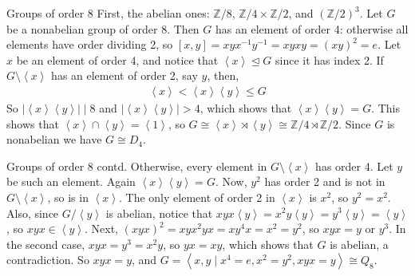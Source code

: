 \documentclass{beamer}
\def\mbb#1{\mathbb{#1}}
\newcommand{\Z}{\mbb Z}
\newcommand{\gen}[1]{\left\langle #1 \right\rangle}
\newcommand{\nsg}{\trianglelefteq}
\begin{document}
\begin{frame}{Groups of order 8}
	First, the abelian ones: $\Z/8$, $\Z/4 \times \Z/2$, and $(\Z/2)^3$. Let $G$ be a nonabelian group of order 8. Then $G$ has an element of order 4: otherwise all elements have order dividing 2, so $[x,y] = xyx^{-1}y^{-1} = xyxy = (xy)^2 = e$. Let $x$ be an element of order 4, and notice that $\gen{x} \nsg G$ since it has index 2. If $G \setminus \gen{x}$ has an element of order 2, say $y$, then,
	\begin{align*}
		\gen{x} < \gen{x} \gen{y} \leq G
	\end{align*}
	So $|\gen{x}\gen{y}| \mid 8$ and $|\gen{x}\gen{y}| > 4$, which shows that $\gen{x}\gen{y} = G$. This shows that $\gen{x} \cap \gen{y} = \gen{1}$, so $G \cong \gen{x} \rtimes \gen{y} \cong \Z/4 \rtimes \Z/2$. Since $G$ is nonabelian we have $G \cong D_4$.
\end{frame}
\begin{frame}{Groups of order 8 contd.}
	Otherwise, every element in $G \setminus \gen{x}$ has order 4. Let $y$ be such an element. Again $\gen{x}\gen{y} = G$. Now, $y^2$ has order 2 and is not in $G \setminus \gen{x}$, so is in $\gen{x}$. The only element of order 2 in $\gen{x}$ is $x^2$, so $y^2=x^2$. Also, since $G/\gen{y}$ is abelian, notice that $xyx\gen{y} = x^2y\gen{y} = y^3\gen{y} = \gen{y}$, so $xyx \in \gen{y}$. Next, $(xyx)^2 = xyx^2yx = xy^4x = x^2 = y^2$, so $xyx = y$ or $y^3$. In the second case, $xyx = y^3 = x^2y$, so $yx = xy$, which shows that $G$ is abelian, a contradiction. So $xyx = y$, and $G = \gen{x, y \mid x^4 = e, x^2=y^2, xyx = y} \cong Q_8$.
\end{frame}
\end{document}
